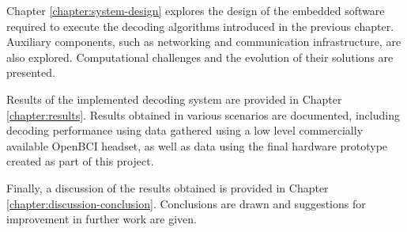 Chapter \ref{chapter:system-design} explores the design of the embedded software required to execute the decoding algorithms introduced in the previous chapter. Auxiliary components, such as networking and communication infrastructure, are also explored. Computational challenges and the evolution of their solutions are presented. 

Results of the implemented decoding system are provided in Chapter \ref{chapter:results}. Results obtained in various scenarios are documented, including decoding performance using data gathered using a low level commercially available OpenBCI headset, as well as data using the final hardware prototype created as part of this project. 

Finally, a discussion of the results obtained is provided in Chapter \ref{chapter:discussion-conclusion}. Conclusions are drawn and suggestions for improvement in further work are given. 